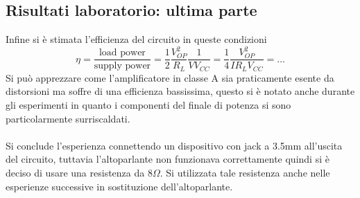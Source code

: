 \subsection{Risultati laboratorio: ultima parte}
Infine si è stimata l'efficienza del circuito in queste condizioni
\begin{equation}
    \eta=\frac{\text{load power}}{\text{supply power}}=\frac{1}{2}\frac{V_{OP}^2}{R_L}\frac{1}{VV_{CC}}=\frac{1}{4}\frac{V_{OP}^2}{IR_LV_{CC}}=\dots
\end{equation}
Si può apprezzare come l'amplificatore in classe A sia praticamente esente da distorsioni ma soffre di una efficienza bassissima, questo si è notato anche durante gli esperimenti in quanto i componenti del finale di potenza si sono particolarmente surriscaldati.\\\\
Si conclude l'esperienza connettendo un dispositivo con jack a 3.5mm all'uscita del circuito, tuttavia l'altoparlante non funzionava correttamente quindi si è deciso di usare una resistenza da 8$\Omega$. Si utilizzata tale resistenza anche nelle esperienze successive in sostituzione dell'altoparlante.